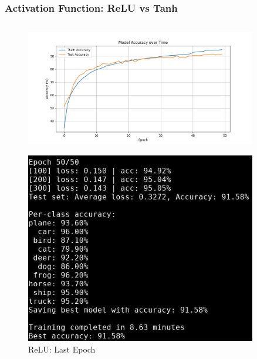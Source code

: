 \begin{frame}
\frametitle{Activation Function: ReLU vs Tanh}
\begin{columns}
    \begin{column}{0.5\textwidth}
        \begin{figure}[t]
            \centering
            \vspace{-0.4cm}
            \includegraphics[width=0.9\textwidth]{media/1stAssignment/cifar10_cnn_accuracy.png}
        \end{figure}
        \vspace{-0.8cm}
        \begin{figure}[t]
            \centering
            \includegraphics[width=0.9\textwidth]{media/1stAssignment/cnn_epoch_50.png}
            \vspace{-0.3cm}
            \caption{ReLU: Last Epoch}
        \end{figure}
    \end{column}


\end{columns}
\end{frame}
